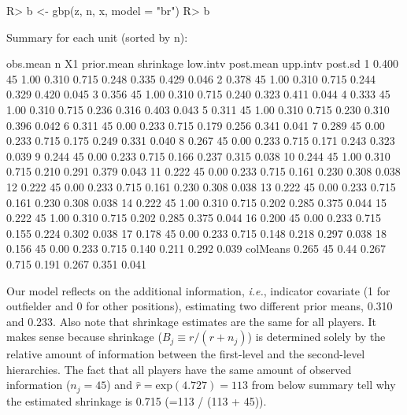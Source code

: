 \documentclass[article]{jss}
\begin{document}
\begin{CodeChunk}
\begin{CodeInput}
R> b <- gbp(z, n, x, model = "br")
R> b
\end{CodeInput}
\begin{CodeOutput}
Summary for each unit (sorted by n):

         obs.mean  n   X1 prior.mean shrinkage low.intv post.mean upp.intv post.sd
1           0.400 45 1.00      0.310     0.715    0.248     0.335    0.429   0.046
2           0.378 45 1.00      0.310     0.715    0.244     0.329    0.420   0.045
3           0.356 45 1.00      0.310     0.715    0.240     0.323    0.411   0.044
4           0.333 45 1.00      0.310     0.715    0.236     0.316    0.403   0.043
5           0.311 45 1.00      0.310     0.715    0.230     0.310    0.396   0.042
6           0.311 45 0.00      0.233     0.715    0.179     0.256    0.341   0.041
7           0.289 45 0.00      0.233     0.715    0.175     0.249    0.331   0.040
8           0.267 45 0.00      0.233     0.715    0.171     0.243    0.323   0.039
9           0.244 45 0.00      0.233     0.715    0.166     0.237    0.315   0.038
10          0.244 45 1.00      0.310     0.715    0.210     0.291    0.379   0.043
11          0.222 45 0.00      0.233     0.715    0.161     0.230    0.308   0.038
12          0.222 45 0.00      0.233     0.715    0.161     0.230    0.308   0.038
13          0.222 45 0.00      0.233     0.715    0.161     0.230    0.308   0.038
14          0.222 45 1.00      0.310     0.715    0.202     0.285    0.375   0.044
15          0.222 45 1.00      0.310     0.715    0.202     0.285    0.375   0.044
16          0.200 45 0.00      0.233     0.715    0.155     0.224    0.302   0.038
17          0.178 45 0.00      0.233     0.715    0.148     0.218    0.297   0.038
18          0.156 45 0.00      0.233     0.715    0.140     0.211    0.292   0.039
colMeans    0.265 45 0.44      0.267     0.715    0.191     0.267    0.351   0.041
\end{CodeOutput}
\end{CodeChunk}
Our model reflects on the additional information, \emph{i.e.}, indicator covariate (1 for outfielder and 0 for other positions), estimating two different prior means, 0.310 and 0.233. Also note that shrinkage estimates are the same for all players. It makes sense because shrinkage ($B_{j}\equiv r / (r+n_{j})$) is determined solely by the relative amount of information between the first-level and the second-level hierarchies. The fact that all players have the same amount of observed information ($n_{j}=45$) and $\hat{r}=\textrm{exp}(4.727)=113$ from below summary tell why the estimated shrinkage is 0.715 (=113 / (113 + 45)).
\end{document}
